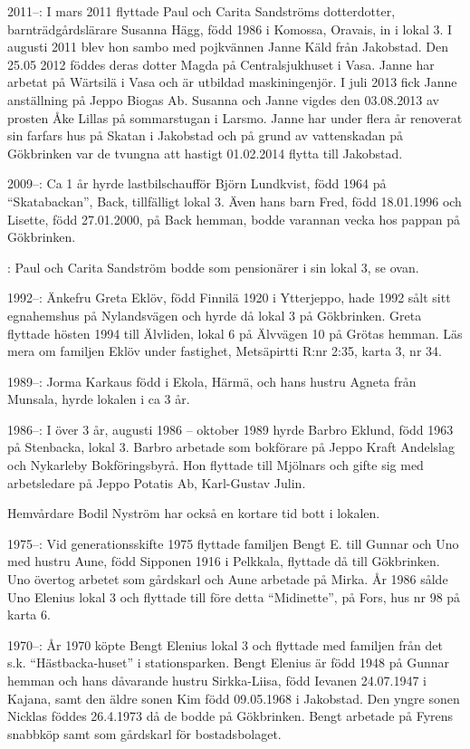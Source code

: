 2011--: I mars 2011 flyttade Paul och Carita Sandströms dotterdotter, barnträdgårdslärare Susanna Hägg, född 1986 i Komossa, Oravais, in i lokal 3. I augusti 2011 blev hon sambo med pojkvännen Janne Käld från Jakobstad. Den 25.05 2012 föddes deras dotter Magda på Centralsjukhuset i Vasa. Janne har arbetat på Wärtsilä i Vasa och är utbildad maskiningenjör. I juli 2013 fick Janne anställning på Jeppo Biogas Ab. Susanna och Janne vigdes den 03.08.2013 av prosten Åke Lillas på sommarstugan i Larsmo. Janne har under flera år renoverat sin farfars hus på Skatan i Jakobstad och på grund av vattenskadan på Gökbrinken var de tvungna att hastigt 01.02.2014 flytta till Jakobstad.

2009--:	Ca 1 år hyrde lastbilschaufför Björn Lundkvist, född 1964 på ``Skatabackan'', Back, tillfälligt lokal 3. Även hans barn Fred, född 18.01.1996 och Lisette, född 27.01.2000, på Back hemman, bodde varannan vecka hos pappan på Gökbrinken.

:	Paul och Carita Sandström bodde som pensionärer i sin lokal 3, se ovan.

1992--: Änkefru Greta Eklöv, född Finnilä 1920 i Ytterjeppo, hade 1992 sålt sitt egnahemshus på Nylandsvägen och hyrde då lokal 3 på Gökbrinken. Greta flyttade hösten 1994 till Älvliden, lokal 6 på Älvvägen 10 på Grötas hemman. Läs mera om familjen Eklöv under fastighet, Metsäpirtti R:nr 2:35, karta 3, nr 34.

1989--: Jorma Karkaus född i Ekola, Härmä, och hans hustru Agneta från Munsala, hyrde lokalen i ca 3 år.

1986--: I över 3 år, augusti 1986 – oktober 1989 hyrde Barbro Eklund, född 1963 på Stenbacka, lokal 3. Barbro arbetade som bokförare på Jeppo Kraft Andelslag och Nykarleby Bokföringsbyrå. Hon flyttade till Mjölnars och gifte sig med arbetsledare på Jeppo Potatis Ab, Karl-Gustav Julin.

Hemvårdare Bodil Nyström har också en kortare tid bott i lokalen.

 1975--:
Vid generationsskifte 1975 flyttade familjen Bengt E. till Gunnar och Uno med hustru Aune, född Sipponen 1916 i Pelkkala, flyttade då till Gökbrinken. Uno övertog arbetet som gårdskarl och Aune arbetade på Mirka. År 1986 sålde Uno Elenius lokal 3 och flyttade till före detta ``Midinette'', på Fors, hus nr 98 på karta 6.

 1970--:
År 1970 köpte Bengt Elenius lokal 3 och flyttade med familjen från det s.k. ``Hästbacka-huset'' i stationsparken.  Bengt Elenius är född 1948 på Gunnar hemman och hans dåvarande hustru Sirkka-Liisa, född Ievanen 24.07.1947 i Kajana, samt den äldre sonen Kim född 09.05.1968 i Jakobstad. Den yngre sonen Nicklas föddes 26.4.1973 då de bodde på Gökbrinken. Bengt arbetade på Fyrens snabbköp samt som gårdskarl för bostadsbolaget.


